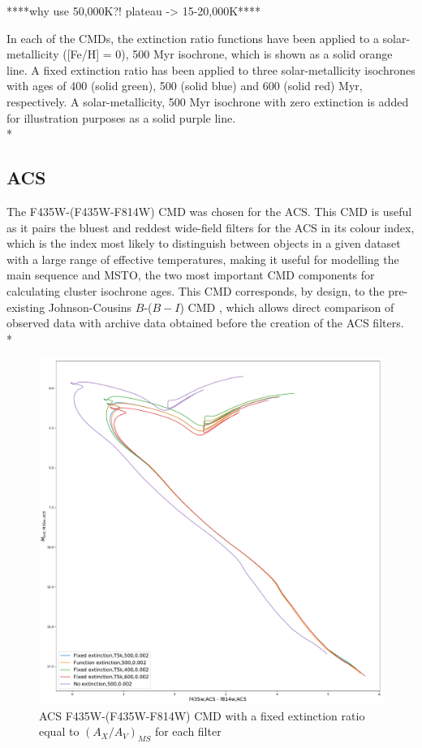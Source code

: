 \documentclass[12pt, a4paper]{report}
\begin{document}
****why use 50,000K?! plateau -> 15-20,000K**** 

In each of the CMDs, the extinction ratio functions have been applied to a solar-metallicity ([Fe/H] = 0), 500 Myr isochrone, which is shown as a solid orange line. A fixed extinction ratio has been applied to three solar-metallicity isochrones with ages of 400 (solid green), 500 (solid blue) and 600 (solid red) Myr, respectively. A solar-metallicity, 500 Myr isochrone with zero extinction is added for illustration purposes as a solid purple line.\\*

\subsection{ACS} \label{ACS_isoc}
The F435W-(F435W-F814W) CMD was chosen for the ACS. This CMD is useful as it pairs the bluest and reddest wide-field filters for the ACS in its colour index, which is the index most likely to distinguish between objects in a given dataset with a large range of effective temperatures, making it useful for modelling the main sequence and MSTO, the two most important CMD components for calculating cluster isochrone ages. This CMD corresponds, by design, to the pre-existing Johnson-Cousins $B$-($B-I$) CMD \citep{2005PASP..117.1049S}, which allows direct comparison of observed data with archive data obtained before the creation of the ACS filters.\\*

\begin{figure}[h!]
\begin{center}
\includegraphics[width=1.0\textwidth]{../basti_isochrones_10_13Gyr/Extinction_T5k_FeH0fix_func_f435wACS_f435wACSmf814wACS_500_400_600_Myr_FeH_0p002_ref_noext_Av_1p0.pdf}
\caption{ACS F435W-(F435W-F814W) CMD with a fixed extinction ratio equal to $(A_{X}/A_{V})_{MS}$ for each filter}
\label{acs_isoc_T5k}
\end{center}
\end{figure}
\end{document}
